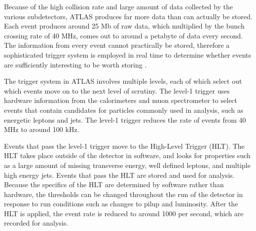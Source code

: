 Because of the high collision rate and large amount of data collected by the various subdetectors, ATLAS produces far more data than can actually be stored. Each event produces around 25 Mb of raw data, which multiplied by the bunch crossing rate of 40 MHz, comes out to around a petabyte of data every second. The information from every event cannot practically be stored, therefore a sophisticated trigger system is employed in real time to determine whether events are sufficiently interesting to be worth storing \cite{PERF-2011-02}.

The trigger system in ATLAS involves multiple levels, each of which select out which events move on to the next level of scrutiny. The level-1 trigger uses hardware information from the calorimeters and muon spectrometer to select events that contain candidates for particles commonly used in analysis, such as energetic leptons and jets. The level-1 trigger reduces the rate of events from 40 MHz to around 100 kHz. 

Events that pass the level-1 trigger move to the High-Level Trigger (HLT). The HLT takes place outside of the detector in software, and looks for properties such as a large amount of missing transverse energy, well defined leptons, and multiple high energy jets. Events that pass the HLT are stored and used for analysis. Because the specifics of the HLT are determined by software rather than hardware, the thresholds can be changed throughout the run of the detector in response to run conditions such as changes to pilup and luminosity. After the HLT is applied, the event rate is reduced to around 1000 per second, which are recorded for analysis.
